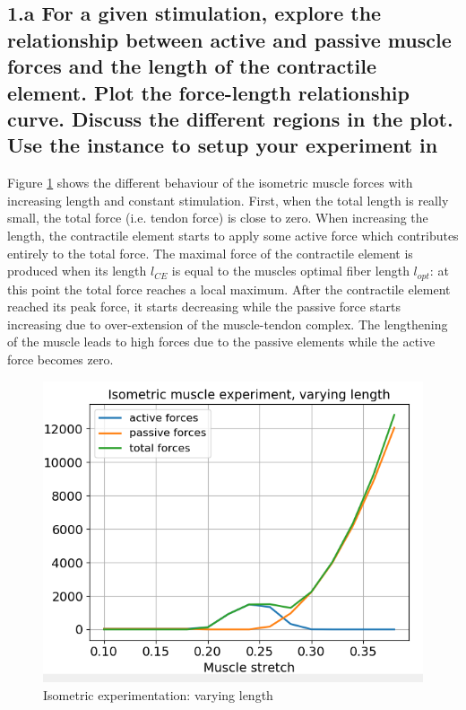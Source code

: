 \documentclass{cmc}
\begin{document}
\subsection*{1.a For a given stimulation, explore the relationship
  between active and passive muscle forces and the length of the
  contractile element.  Plot the force-length relationship curve.
  Discuss the different regions in the plot. Use the
   instance
  to setup your experiment in }
  
Figure \ref{fig:1a} shows the different behaviour of the isometric muscle forces with increasing length and constant stimulation. First, when the total length is really small, the total force (i.e. tendon force) is close to zero. When increasing the length, the contractile element starts to apply some active force which contributes entirely to the total force. The maximal force of the contractile element is produced when its length $l_{CE}$ is equal to the muscles optimal fiber length $l_{opt}$: at this point the total force  reaches a local maximum. After the contractile element reached its peak force, it starts decreasing while the passive force starts increasing due to over-extension of the muscle-tendon complex. The lengthening of the muscle leads to high forces due to the passive elements while the active force becomes zero. 

\begin{figure}[H]
  \centering \includegraphics[scale=1]{figures/fig1}
  \caption{Isometric experimentation: varying length}
  \label{fig:1a}
\end{figure}
\end{document}
